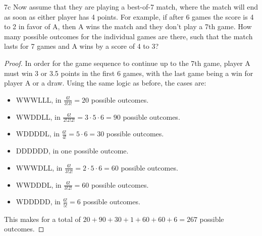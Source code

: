\begin{exercise}{7c}
 Now assume that they are playing a best-of-7 match, where the match will end as
soon as either player has 4 points. For example, if after 6 games the score is 4 to 2 in
favor of A, then A wins the match and they don’t play a 7th game. How many possible
outcomes for the individual games are there, such that the match lasts for 7 games and
A wins by a score of 4 to 3?
\end{exercise}


\begin{proof}
    In order for the game sequence to continue up to the 7th game, player A must win 3 or 3.5 points in the first 6 games, with the last game being a win for player A or a draw. Using the same logic as before, the cases are:

    \begin{itemize}
        \item WWWLLL, in $\frac{6!}{3!3!} = 20$ possible outcomes.
        \item WWDDLL, in $\frac{6!}{2!2!2!} = 3 \cdot 5 \cdot 6 = 90$ possible outcomes.
        \item WDDDDL, in $\frac{6!}{4!} = 5 \cdot 6 = 30$ possible outcomes.
        \item DDDDDD, in one possible outcome.
        \item WWWDLL, in $\frac{6!}{3!2!} = 2 \cdot 5 \cdot 6 = 60$ possible outcomes.
        \item WWDDDL, in $\frac{6!}{3!2!} = 60$ possible outcomes.
        \item WDDDDD, in $\frac{6!}{5!} = 6$ possible outcomes.
    \end{itemize}

    This makes for a total of $20+90+30+1+60+60+6 = 267$ possible outcomes.
\end{proof}


